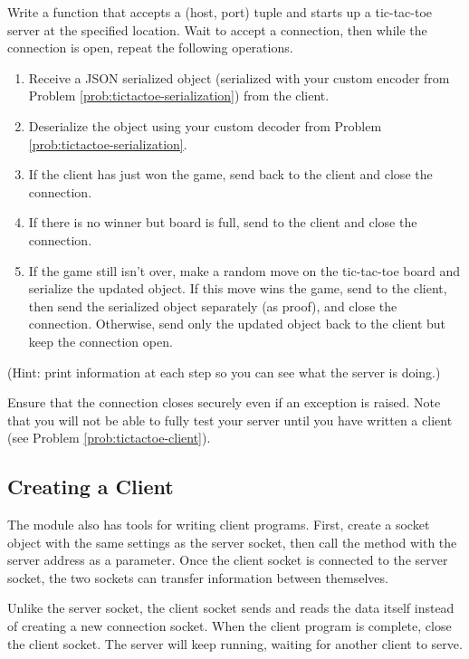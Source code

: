 \begin{problem}
Write a function that accepts a (host, port) tuple and starts up a tic-tac-toe server at the specified location.
Wait to accept a connection, then while the connection is open, repeat the following operations.
\begin{enumerate}
\item Receive a JSON serialized  object (serialized with your custom encoder from Problem \ref{prob:tictactoe-serialization}) from the client.
\item Deserialize the  object using your custom decoder from Problem \ref{prob:tictactoe-serialization}.
\item If the client has just won the game, send  back to the client and close the connection.
\item If there is no winner but board is full, send  to the client and close the connection.
\item If the game still isn't over, make a random move on the tic-tac-toe board and serialize the updated  object.
If this move wins the game, send  to the client, then send the serialized object separately (as proof), and close the connection.
Otherwise, send only the updated  object back to the client but keep the connection open.
\end{enumerate}
(Hint: print information at each step so you can see what the server is doing.)

Ensure that the connection closes securely even if an exception is raised.
Note that you will not be able to fully test your server until you have written a client (see Problem \ref{prob:tictactoe-client}).
\label{prob:tictactoe-server}
\end{problem}

\subsection*{Creating a Client} %

The  module also has tools for writing client programs.
First, create a socket object with the same settings as the server socket, then call the  method with the server address as a parameter.
Once the client socket is connected to the server socket, the two sockets can transfer information between themselves.

Unlike the server socket, the client socket sends and reads the data itself instead of creating a new connection socket.
When the client program is complete, close the client socket.
The server will keep running, waiting for another client to serve.

